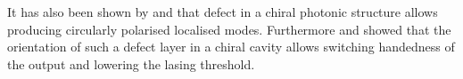 It has also been shown by \textcite{kopp_twist_2002} and \textcite{oldano_comment_2004} that defect in a chiral photonic structure allows producing circularly polarised localised modes. Furthermore \textcite{harutyunyan_optical_2007} and \textcite{belyakova_optical_2011} showed that the orientation of such a defect layer in a chiral cavity allows switching handedness of the output and lowering the lasing threshold.

